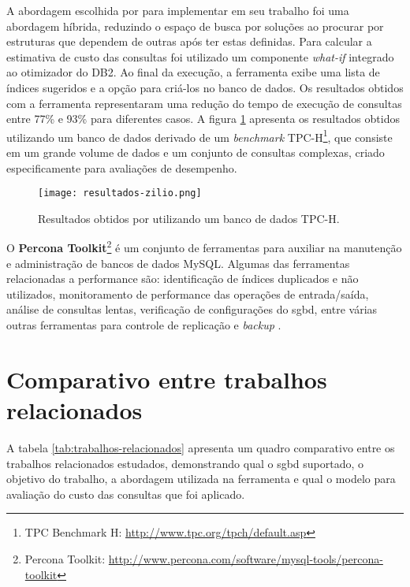 A abordagem escolhida por  para implementar em seu trabalho foi uma abordagem híbrida, reduzindo o espaço de busca por soluções ao procurar por estruturas que dependem de outras após ter estas definidas. Para calcular a estimativa de custo das consultas foi utilizado um componente \emph{what-if} integrado ao otimizador do DB2. Ao final da execução, a ferramenta exibe uma lista de índices sugeridos e a opção para criá-los no banco de dados. Os resultados obtidos com a ferramenta representaram uma redução do tempo de execução de consultas entre 77\% e 93\% para diferentes casos. A figura \ref{fig:resultados-zilio} apresenta os resultados obtidos utilizando um banco de dados derivado de um \emph{benchmark} TPC-H\footnote{TPC Benchmark H: \url{http://www.tpc.org/tpch/default.asp}}, que consiste em um grande volume de dados e um conjunto de consultas complexas, criado especificamente para avaliações de desempenho.

\begin{figure}[H]
  \centering
  \caption{Resultados obtidos por  utilizando um banco de dados TPC-H.}
  \texttt{[image: resultados-zilio.png]}
  \label{fig:resultados-zilio}
\end{figure}

O \textbf{Percona Toolkit}\footnote{Percona Toolkit: \url{http://www.percona.com/software/mysql-tools/percona-toolkit}} é um conjunto de ferramentas para auxiliar na manutenção e administração de bancos de dados MySQL. Algumas das ferramentas relacionadas a performance são: identificação de índices duplicados e não utilizados, monitoramento de performance das operações de entrada/saída, análise de consultas lentas, verificação de configurações do \gls{sgbd}, entre várias outras ferramentas para controle de replicação e \emph{backup} \cite{PerconaToolkit:2015}.

\section{Comparativo entre trabalhos relacionados}

A tabela \ref{tab:trabalhos-relacionados} apresenta um quadro comparativo entre os trabalhos relacionados estudados, demonstrando qual o \gls{sgbd} suportado, o objetivo do trabalho, a abordagem utilizada na ferramenta e qual o modelo para avaliação do custo das consultas que foi aplicado.

